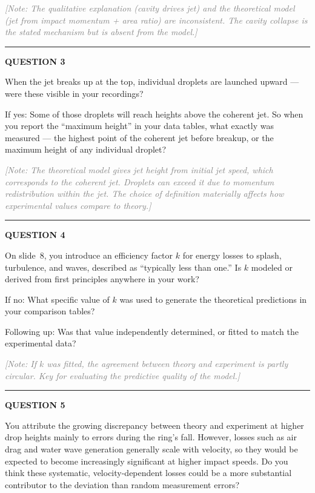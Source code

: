 \documentclass[a4paper,11pt]{article}
\newcommand{\qtitle}[1]{{\small\textbf{QUESTION #1}}\par\smallskip}
\newcommand{\qdivider}{\vspace{0.7em}\noindent\rule{\textwidth}{0.4pt}\vspace{0.7em}}
\begin{document}
\medskip
\noindent\textcolor{gray}{\small\itshape [Note: The qualitative explanation (cavity drives jet) and the theoretical model (jet from impact momentum + area ratio) are inconsistent. The cavity collapse is the stated mechanism but is absent from the model.]}

\qdivider

\qtitle{3}
When the jet breaks up at the top, individual droplets are launched upward --- were these visible in your recordings?

\medskip
\noindent\hspace{1.5em}If yes: Some of those droplets will reach heights above the coherent jet. So when you report the ``maximum height'' in your data tables, what exactly was measured --- the highest point of the coherent jet before breakup, or the maximum height of any individual droplet?

\medskip
\noindent\textcolor{gray}{\small\itshape [Note: The theoretical model gives jet height from initial jet speed, which corresponds to the coherent jet. Droplets can exceed it due to momentum redistribution within the jet. The choice of definition materially affects how experimental values compare to theory.]}

\qdivider

\qtitle{4}
On slide~8, you introduce an efficiency factor $k$ for energy losses to splash, turbulence, and waves, described as ``typically less than one.'' Is $k$ modeled or derived from first principles anywhere in your work?

\medskip
\noindent\hspace{1.5em}If no: What specific value of $k$ was used to generate the theoretical predictions in your comparison tables?

\medskip
\noindent\hspace{1.5em}Following up: Was that value independently determined, or fitted to match the experimental data?

\medskip
\noindent\textcolor{gray}{\small\itshape [Note: If $k$ was fitted, the agreement between theory and experiment is partly circular. Key for evaluating the predictive quality of the model.]}

\qdivider

\qtitle{5}
You attribute the growing discrepancy between theory and experiment at higher drop heights mainly to errors during the ring's fall. However, losses such as air drag and water wave generation generally scale with velocity, so they would be expected to become increasingly significant at higher impact speeds. Do you think these systematic, velocity-dependent losses could be a more substantial contributor to the deviation than random measurement errors?
\end{document}
